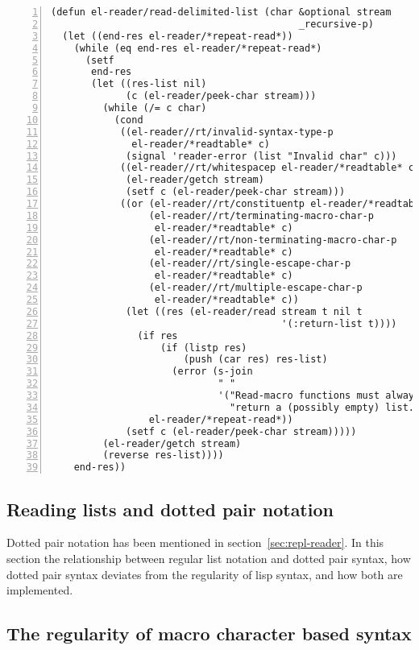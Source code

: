 \documentclass[a4paper,10pt,twoside]{report}
\newcommand{\fun}[1]{\texttt{#1}}
\begin{document}
\begin{lstlisting}[style=lispcode,label={code:read-delim-list},caption={Code for
  \fun{read-delimited-list}},numbers=left]
(defun el-reader/read-delimited-list (char &optional stream
                                           _recursive-p)
  (let ((end-res el-reader/*repeat-read*))
    (while (eq end-res el-reader/*repeat-read*)
      (setf
       end-res
       (let ((res-list nil)
             (c (el-reader/peek-char stream)))
         (while (/= c char)
           (cond
            ((el-reader//rt/invalid-syntax-type-p
              el-reader/*readtable* c)
             (signal 'reader-error (list "Invalid char" c)))
            ((el-reader//rt/whitespacep el-reader/*readtable* c)
             (el-reader/getch stream)
             (setf c (el-reader/peek-char stream)))
            ((or (el-reader//rt/constituentp el-reader/*readtable* c)
                 (el-reader//rt/terminating-macro-char-p
                  el-reader/*readtable* c)
                 (el-reader//rt/non-terminating-macro-char-p
                  el-reader/*readtable* c)
                 (el-reader//rt/single-escape-char-p
                  el-reader/*readtable* c)
                 (el-reader//rt/multiple-escape-char-p
                  el-reader/*readtable* c))
             (let ((res (el-reader/read stream t nil t
                                        '(:return-list t))))
               (if res
                   (if (listp res)
                       (push (car res) res-list)
                     (error (s-join
                             " "
                             '("Read-macro functions must always "
                               "return a (possibly empty) list."))))
                 el-reader/*repeat-read*))
             (setf c (el-reader/peek-char stream)))))
         (el-reader/getch stream)
         (reverse res-list))))
    end-res))
\end{lstlisting}

\subsection{Reading lists and dotted pair notation}
\label{subsec:list-dotted-pair}

Dotted pair notation has been mentioned in section~\ref{sec:repl-reader}.  In
this section the relationship between regular list notation and dotted pair
syntax, how dotted pair syntax deviates from the regularity of lisp syntax, and
how both are implemented.

\subsection{The regularity of macro character based syntax}
\label{subsec:reg-by-macro}
\end{document}
